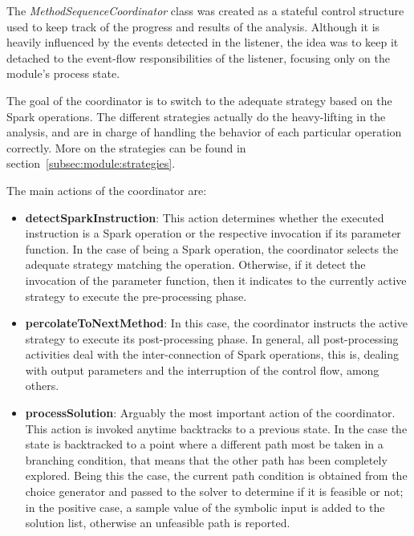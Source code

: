 
The \textit{MethodSequenceCoordinator} class was created as a stateful control structure used to keep track of the progress and results of the analysis. Although it is heavily influenced by the events detected in the listener, the idea was to keep it detached to the event-flow responsibilities of the listener, focusing only on the module's process state.

The goal of the coordinator is to switch to the adequate strategy based on the Spark operations. The different strategies actually do the heavy-lifting in the analysis, and are in charge of handling the behavior of each particular operation correctly. More on the strategies can be found in section~\ref{subsec:module:strategies}.

The main actions of the coordinator are:

\begin{itemize}
	\item \textbf{detectSparkInstruction}: This action determines whether the executed instruction is a Spark operation or the respective invocation if its parameter function. In the case of being a Spark operation, the coordinator selects the adequate strategy matching the operation. Otherwise, if it detect the invocation of the parameter function, then it indicates to the currently active strategy to execute the pre-processing phase.
	\item \textbf{percolateToNextMethod}: In this case, the coordinator instructs the active strategy to execute its post-processing phase. In general, all post-processing activities deal with the inter-connection of Spark operations, this is, dealing with output parameters and the interruption of the control flow, among others.
	\item \textbf{processSolution}: Arguably the most important action of the coordinator. This action is invoked anytime \jpf backtracks to a previous state. In the case the state is backtracked to a point where a different path most be taken in a branching condition, that means that the other path has been completely explored. Being this the case, the current path condition is obtained from the choice generator and passed to the solver to determine if it is feasible or not; in the positive case, a sample value of the symbolic input is added to the solution list, otherwise an unfeasible path is reported.
\end{itemize}

